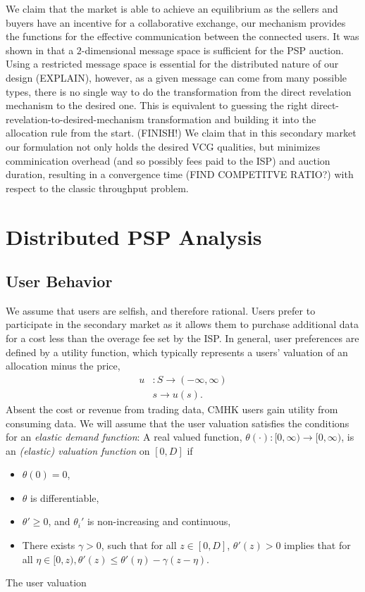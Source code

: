 \documentclass[12pt]{article}
\theoremstyle{definition}
\begin{document}
\begin{multicols}{2}
We claim that the market is
able to achieve an equilibrium as the sellers and buyers have an
incentive for a collaborative exchange, our mechanism provides the functions
for the effective communication between the connected users. It was shown in
\cite{lazar} that a $2$-dimensional message space is sufficient for the PSP
auction. Using a restricted message space is essential for the distributed
nature of our design (EXPLAIN), however, as a given message can come from many
possible types, there is no single
way to do the transformation from the direct revelation mechanism to the
desired one. This is equivalent to guessing the
right direct-revelation-to-desired-mechanism transformation and building it
into the allocation rule from the start. (FINISH!)
We claim that in
this secondary market our formulation not only holds the desired VCG qualities,
but minimizes comminication overhead (and so possibly fees paid to the ISP)
and auction duration, resulting in a convergence time (FIND COMPETITVE RATIO?)
with respect to the classic throughput problem. 



\section{Distributed PSP Analysis}

\subsection{User Behavior}

We assume that users are selfish, and therefore
rational. Users prefer to participate in the secondary market as it allows them to purchase
additional data for a cost less than the overage fee set by the ISP. 
In general, user preferences are defined by a utility function, which typically
represents a users' valuation of an allocation minus the price, 
\begin{align*}
    u &: S \rightarrow (-\infty, \infty) \\
          & s \rightarrow u(s).
\end{align*}
Absent the cost or revenue from trading data, CMHK users gain utility from consuming
data. 
We will assume that the user valuation satisfies the conditions for an
\emph{elastic demand function}: 
A real valued function, $\theta(\cdot): [0,\infty) \rightarrow [0,\infty)$, is an \emph{(elastic) valuation
function} on $[0, D]$ if 
\begin{itemize}
    \item $\theta(0) = 0$,
    \item $\theta$ is differentiable,
    \item ${\theta}' \ge 0$, and ${\theta_i}'$ is non-increasing and continuous,
     \item There exists $\gamma > 0$, such that for all $z \in [0,D]$,
${\theta}'(z) > 0$ implies that for all $\eta \in [0, z), {\theta}'(z) \le
{\theta}'(\eta)
- \gamma(z - \eta)$. 
\end{itemize}
The user valuation



\end{multicols}
\end{document}
